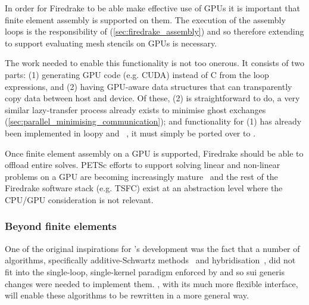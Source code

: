 \documentclass[thesis]{subfiles}
\begin{document}
In order for Firedrake to be able make effective use of GPUs it is important that finite element assembly is supported on them.
The execution of the assembly loops is the responsibility of  (\cref{sec:firedrake_assembly}) and so therefore extending  to support evaluating mesh stencils on GPUs is necessary.

The work needed to enable this functionality is not too onerous.
It consists of two parts:
(1) generating GPU code (e.g. CUDA) instead of C from the loop expressions, and
(2) having GPU-aware data structures that can transparently copy data between host and device.
Of these, (2) is straightforward to do, a very similar lazy-transfer process already exists to minimise ghost exchanges (\cref{sec:parallel_minimising_communication}); and functionality for (1) has already been implemented in loopy and ~\cite{fenics2021-kulkarni}, it must simply be ported over to .

Once finite element assembly on a GPU is supported, Firedrake should be able to offload entire solves.
PETSc efforts to support solving linear and non-linear problems on a GPU are becoming increasingly mature~\cite{MILLS2021102831,millsPETScTAODevelopments2024}
and the rest of the Firedrake software stack (e.g. TSFC) exist at an abstraction level where the CPU/GPU consideration is not relevant.

\subsubsection{Beyond finite elements}
\label{sec:more_stencils}

One of the original inspirations for 's development was the fact that a number of algorithms, specifically additive-Schwartz methods~\cite{farrellPCPATCHSoftwareTopological2021} and hybridisation~\cite{gibsonSlateExtendingFiredrake2020}, did not fit into the single-loop, single-kernel paradigm enforced by  and so sui generis changes were needed to implement them.
, with its much more flexible interface, will enable these algorithms to be rewritten in a more general way.
\end{document}
